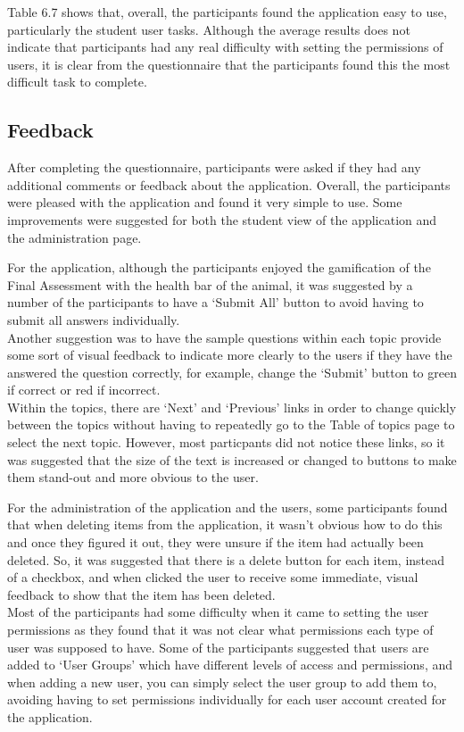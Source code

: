 \documentclass{l3proj}
\begin{document}
{Table 6.7 shows that, overall, the participants found the application easy to use, particularly the student user tasks.
Although the average results does not indicate that participants had any real difficulty with setting the permissions of users, it is clear from the questionnaire that the participants found this the most difficult task to complete.

\subsection{Feedback}

After completing the questionnaire, participants were asked if they had any additional comments or feedback about the application. Overall, the participants were pleased with the application and found it very simple to use. Some improvements were suggested for both the student view of the application and the administration page.

For the application, although the participants enjoyed the gamification of the Final Assessment with the health bar of the animal, it was suggested by a number of the participants to have a `Submit All' button to avoid having to submit all answers individually.\\
Another suggestion was to have the sample questions within each topic provide some sort of visual feedback to indicate more clearly to the users if they have the answered the question correctly, for example, change the `Submit' button to green if correct or red if incorrect.\\
Within the topics, there are `Next' and `Previous' links in order to change quickly between the topics without having to repeatedly go to the Table of topics page to select the next topic. However, most particpants did not notice these links, so it was suggested that the size of the text is increased or changed to buttons to make them stand-out and more obvious to the user.

For the administration of the application and the users, some participants found that when deleting items from the application, it wasn't obvious how to do this and once they figured it out, they were unsure if the item had actually been deleted. So, it was suggested that there is a delete button for each item, instead of a checkbox, and when clicked the user to receive some immediate, visual feedback to show that the item has been deleted.\\ 
Most of the participants had some difficulty when it came to setting the user permissions as they found that it was not clear what permissions each type of user was supposed to have. Some of the participants suggested that users are added to  `User Groups' which have different levels of access and permissions, and when adding a new user, you can simply select the user group to add them to, avoiding having to set permissions individually for each user account created for the application.

}
\end{document}
